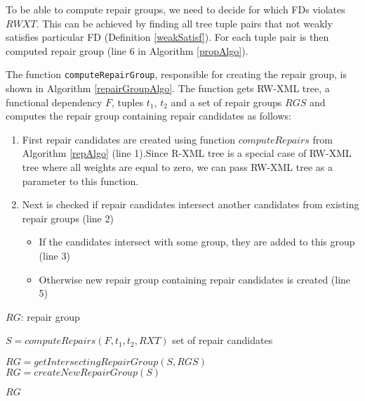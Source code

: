 To be able to compute repair groups, we need to decide for which FDs violates $RWXT$. This can be achieved by finding all tree tuple pairs that not weakly satisfies particular FD (Definition \ref{weakSatisf}). For each tuple pair is then computed repair group (line 6 in Algorithm \ref{propAlgo}).

The function \texttt{computeRepairGroup}, responsible for creating the repair group, is shown in Algorithm \ref{repairGroupAlgo}. The function gets RW-XML tree, a functional dependency $F$, tuples $t_1$, $t_2$ and a set of repair groups $RGS$ and computes the repair group containing repair candidates as follows:

\begin{enumerate}
	\item First repair candidates are created using function $computeRepairs$ from Algorithm \ref{repAlgo} (line 1).Since R-XML tree is a special case of RW-XML tree where all weights are equal to zero, we can pass RW-XML tree as a parameter to this function.
    \item Next is checked if repair candidates intersect another candidates from existing repair groups (line 2)
    \begin{itemize}
    	\item If the candidates intersect with some group, they are added to this group (line 3)
        \item Otherwise new repair group containing repair candidates is created (line 5)
    \end{itemize}
\end{enumerate}

\begin{algorithm}
\caption{$computeRepairGroup(F, t_1, t_2, RXT, RGS)$}
\label{repairGroupAlgo}
\begin{algorithmic}[1]
\ENSURE $RG$: repair group

\STATE $S = computeRepairs(F, t_1, t_2, RXT)$ \COMMENT set of repair candidates

\STATE $RG = getIntersectingRepairGroup(S, RGS)$
\ELSE
\STATE $RG = createNewRepairGroup(S)$
\ENDIF

\RETURN $RG$
\end{algorithmic}
\end{algorithm}

